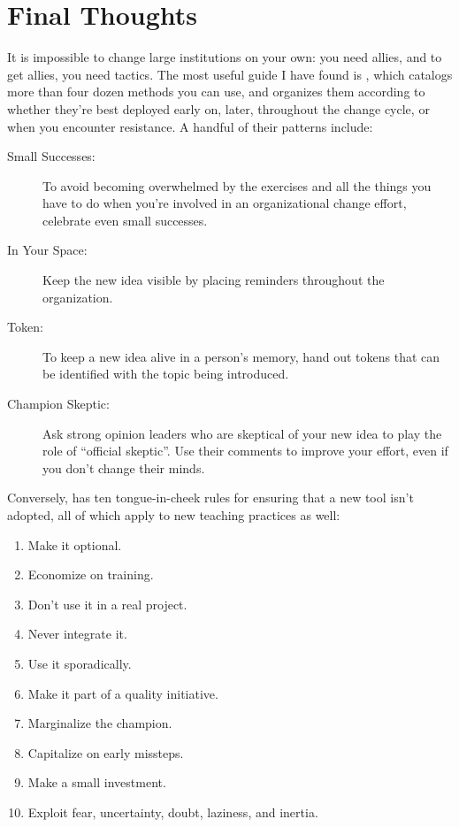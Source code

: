 \section{Final Thoughts}\label{s:partner-final}

It is impossible to change large institutions on your own: you need
allies, and to get allies, you need tactics. The most useful guide I
have found is \cite{Mann2015}, which catalogs more than four dozen
methods you can use, and organizes them according to whether they're
best deployed early on, later, throughout the change cycle, or when you
encounter resistance. A handful of their patterns include:

\begin{description}
\item[Small Successes:]
To avoid becoming overwhelmed by the exercises and all the things
you have to do when you're involved in an organizational change
effort, celebrate even small successes.
\item[In Your Space:]
Keep the new idea visible by placing reminders throughout the
organization.
\item[Token:]
To keep a new idea alive in a person's memory, hand out tokens that
can be identified with the topic being introduced.
\item[Champion Skeptic:]
Ask strong opinion leaders who are skeptical of your new idea to
play the role of ``official skeptic''. Use their comments to improve
your effort, even if you don't change their minds.
\end{description}

Conversely, \cite{Farm2006} has ten tongue-in-cheek rules for
ensuring that a new tool isn't adopted, all of which apply to new
teaching practices as well:

\begin{enumerate}
\item
  Make it optional.
\item
  Economize on training.
\item
  Don't use it in a real project.
\item
  Never integrate it.
\item
  Use it sporadically.
\item
  Make it part of a quality initiative.
\item
  Marginalize the champion.
\item
  Capitalize on early missteps.
\item
  Make a small investment.
\item
  Exploit fear, uncertainty, doubt, laziness, and inertia.
\end{enumerate}

